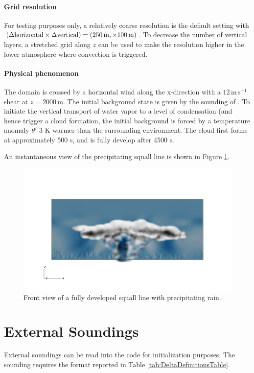 \documentclass{report}
\begin{document}
\paragraph{Grid resolution} For testing purposes only, a relatively coarse resolution is the default setting with $(\Delta {\rm horizontal}\times \Delta {\rm vertical}) = (250\,{\rm m}, \times 100\,{\rm m})$. To decrease the number of vertical layers, a stretched grid along $z$ can be used to make the resolution higher in the lower atmosphere where convection is triggered. 

\paragraph{Physical phenomenon}
The domain is crossed by a horizontal wind along the x-direction with a $12\,\mathrm{m\,s^{-1}}$ shear at $z=2000\,\mathrm{m}$.
The initial background state is given by the sounding of \cite{gabersekGiraldoDoyle2012}.
To initiate the vertical transport of water vapor to a level of condensation (and hence trigger a cloud formation, the initial background is forced by a temperature anomaly $\theta'$ $3$ K warmer than the surrounding environment. The cloud first forms at approximately 500 s, and is fully develop after 4500 s. 

An instantaneous view of the precipitating squall line is shown in Figure \ref{fig:benchmarks/squall1}. 

\begin{figure}[htbp]
\includegraphics[width=1.2\textwidth]{figures/squall_working_warm_rain_frontal_view0028.png}
\caption{Front view of a fully developed squall line with precipitating rain. }
\label{fig:benchmarks/squall1}
\end{figure}

\section{External Soundings}
External soundings can be read into the code for initialization purposes. The sounding requires the format reported in Table \ref{tab:DeltaDefinitionsTable}.
\end{document}
